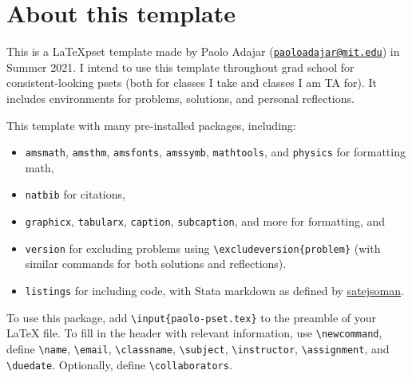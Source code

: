\documentclass[11pt]{article}
\makeatletter
\newcommand{\email}{paoloadajar@mit.edu}
\makeatother
\begin{document}
	
	
	\psetheader
	
	\section*{About this template }
	\begin{problem}
		This is a \LaTeX pset template made by Paolo Adajar (\href{mailto:\email}{\tt \email}) in Summer 2021. I intend to use this template throughout grad school for consistent-looking psets (both for classes I take and classes I am TA for). It includes environments for problems, solutions, and personal reflections.
		
		This template with many pre-installed packages, including:
		\begin{itemize}
			\item \texttt{amsmath}, \texttt{amsthm}, \texttt{amsfonts}, \texttt{amssymb}, \texttt{mathtools}, and \texttt{physics} for formatting math,
			\item \texttt{natbib} for citations,
			\item \texttt{graphicx}, \texttt{tabularx}, \texttt{caption}, \texttt{subcaption}, and more for formatting, and
			\item \texttt{version} for excluding problems using \texttt{\textbackslash excludeversion\{problem\}} (with similar commands for both solutions and reflections).
			\item \texttt{listings} for including code, with Stata markdown as defined by \href{https://github.com/satejsoman/stata-lstlisting}{satejsoman}.
		\end{itemize}
	
		To use this package, add \texttt{\textbackslash input\{paolo-pset.tex\}} to the preamble of your {\LaTeX} file. To fill in the header with relevant information, use \texttt{\textbackslash newcommand}, define \texttt{\textbackslash name}, \texttt{\textbackslash email}, \texttt{\textbackslash classname}, \texttt{\textbackslash subject}, \texttt{\textbackslash instructor}, \texttt{\textbackslash assignment}, and \texttt{\textbackslash duedate}. Optionally, define \texttt{\textbackslash collaborators}.
	\end{problem}
\end{document}
